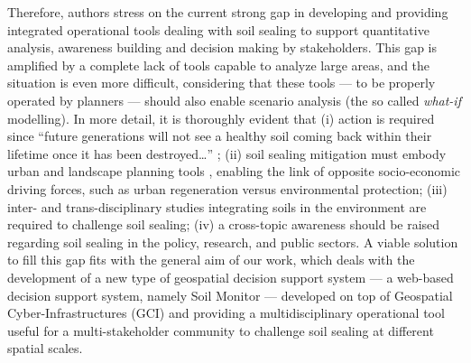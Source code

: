 \documentclass[APA,LATO1COL,doublespace]{WileyNJD-v2}
\newcommand{\toberevised}[1]{\emph{\textcolor{red}{#1}}} %
\newcommand{\reviewer}[1]{\emph{\textcolor{cyan}{#1}}}   %
\begin{document}
Therefore, authors stress on the current
strong gap in developing and providing integrated operational tools 
dealing with soil sealing 
to support quantitative analysis, awareness building and decision making by stakeholders.
This gap is amplified by a complete lack of tools 
capable to analyze large areas, and the situation is even more difficult, considering that these tools --- to be properly operated by planners --- should also enable scenario analysis (the so called \textit{what-if} modelling).
In more detail, it is thoroughly evident that 
(i) action is required since ``future generations will not see a healthy soil coming back within their lifetime once it has been destroyed\dots'' \citep{SWD12}; 
(ii) soil sealing mitigation must embody urban and landscape planning tools \citep{Artmann14}, enabling the link of opposite socio-economic driving forces, such as urban regeneration versus environmental protection; 
(iii) inter- and trans-disciplinary studies integrating soils in the environment are required to challenge soil sealing;
(iv) a cross-topic awareness should be raised regarding soil sealing in the policy, research, and public sectors.
A viable solution to fill this gap fits with the general aim of our work, which deals with the development of
a new type of geospatial decision support system --- a web-based decision support system, namely Soil Monitor --- developed on top of Geospatial Cyber-Infrastructures (GCI) and providing a multidisciplinary operational tool useful for a multi-stakeholder community to challenge soil sealing at different spatial scales.

\end{document}
